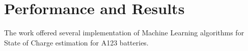 \section{Performance and Results}\label{sec:results}
The work offered several implementation of Machine Learning algorithms for State of Charge estimation for A123 batteries.